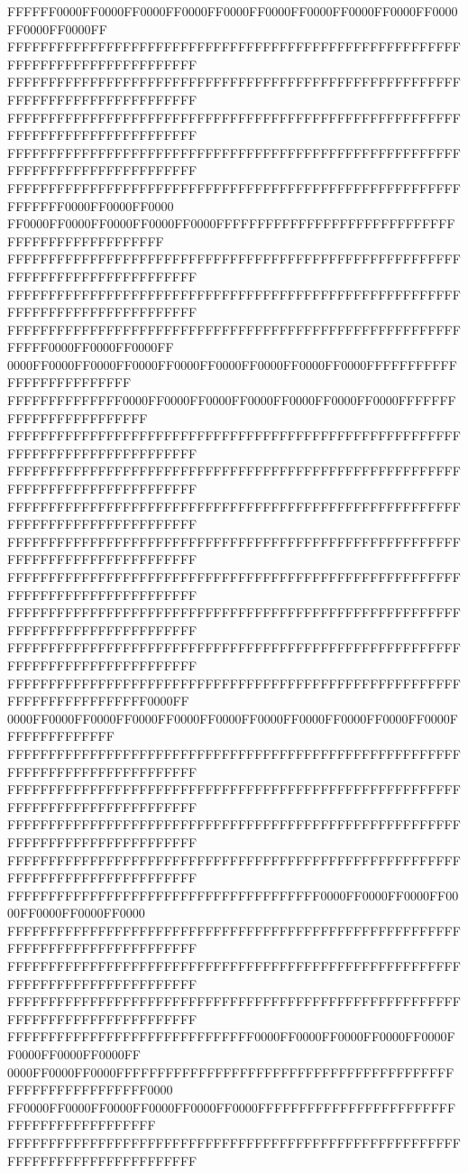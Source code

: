 FFFFFF0000FF0000FF0000FF0000FF0000FF0000FF0000FF0000FF0000FF0000FF0000FF0000FF
FFFFFFFFFFFFFFFFFFFFFFFFFFFFFFFFFFFFFFFFFFFFFFFFFFFFFFFFFFFFFFFFFFFFFFFFFFFFFF
FFFFFFFFFFFFFFFFFFFFFFFFFFFFFFFFFFFFFFFFFFFFFFFFFFFFFFFFFFFFFFFFFFFFFFFFFFFFFF
FFFFFFFFFFFFFFFFFFFFFFFFFFFFFFFFFFFFFFFFFFFFFFFFFFFFFFFFFFFFFFFFFFFFFFFFFFFFFF
FFFFFFFFFFFFFFFFFFFFFFFFFFFFFFFFFFFFFFFFFFFFFFFFFFFFFFFFFFFFFFFFFFFFFFFFFFFFFF
FFFFFFFFFFFFFFFFFFFFFFFFFFFFFFFFFFFFFFFFFFFFFFFFFFFFFFFFFFFFFF0000FF0000FF0000
FF0000FF0000FF0000FF0000FF0000FFFFFFFFFFFFFFFFFFFFFFFFFFFFFFFFFFFFFFFFFFFFFFFF
FFFFFFFFFFFFFFFFFFFFFFFFFFFFFFFFFFFFFFFFFFFFFFFFFFFFFFFFFFFFFFFFFFFFFFFFFFFFFF
FFFFFFFFFFFFFFFFFFFFFFFFFFFFFFFFFFFFFFFFFFFFFFFFFFFFFFFFFFFFFFFFFFFFFFFFFFFFFF
FFFFFFFFFFFFFFFFFFFFFFFFFFFFFFFFFFFFFFFFFFFFFFFFFFFFFFFFFFFF0000FF0000FF0000FF
0000FF0000FF0000FF0000FF0000FF0000FF0000FF0000FF0000FFFFFFFFFFFFFFFFFFFFFFFFFF
FFFFFFFFFFFFFF0000FF0000FF0000FF0000FF0000FF0000FF0000FFFFFFFFFFFFFFFFFFFFFFFF
FFFFFFFFFFFFFFFFFFFFFFFFFFFFFFFFFFFFFFFFFFFFFFFFFFFFFFFFFFFFFFFFFFFFFFFFFFFFFF
FFFFFFFFFFFFFFFFFFFFFFFFFFFFFFFFFFFFFFFFFFFFFFFFFFFFFFFFFFFFFFFFFFFFFFFFFFFFFF
FFFFFFFFFFFFFFFFFFFFFFFFFFFFFFFFFFFFFFFFFFFFFFFFFFFFFFFFFFFFFFFFFFFFFFFFFFFFFF
FFFFFFFFFFFFFFFFFFFFFFFFFFFFFFFFFFFFFFFFFFFFFFFFFFFFFFFFFFFFFFFFFFFFFFFFFFFFFF
FFFFFFFFFFFFFFFFFFFFFFFFFFFFFFFFFFFFFFFFFFFFFFFFFFFFFFFFFFFFFFFFFFFFFFFFFFFFFF
FFFFFFFFFFFFFFFFFFFFFFFFFFFFFFFFFFFFFFFFFFFFFFFFFFFFFFFFFFFFFFFFFFFFFFFFFFFFFF
FFFFFFFFFFFFFFFFFFFFFFFFFFFFFFFFFFFFFFFFFFFFFFFFFFFFFFFFFFFFFFFFFFFFFFFFFFFFFF
FFFFFFFFFFFFFFFFFFFFFFFFFFFFFFFFFFFFFFFFFFFFFFFFFFFFFFFFFFFFFFFFFFFFFFFF0000FF
0000FF0000FF0000FF0000FF0000FF0000FF0000FF0000FF0000FF0000FF0000FFFFFFFFFFFFFF
FFFFFFFFFFFFFFFFFFFFFFFFFFFFFFFFFFFFFFFFFFFFFFFFFFFFFFFFFFFFFFFFFFFFFFFFFFFFFF
FFFFFFFFFFFFFFFFFFFFFFFFFFFFFFFFFFFFFFFFFFFFFFFFFFFFFFFFFFFFFFFFFFFFFFFFFFFFFF
FFFFFFFFFFFFFFFFFFFFFFFFFFFFFFFFFFFFFFFFFFFFFFFFFFFFFFFFFFFFFFFFFFFFFFFFFFFFFF
FFFFFFFFFFFFFFFFFFFFFFFFFFFFFFFFFFFFFFFFFFFFFFFFFFFFFFFFFFFFFFFFFFFFFFFFFFFFFF
FFFFFFFFFFFFFFFFFFFFFFFFFFFFFFFFFFFFFF0000FF0000FF0000FF0000FF0000FF0000FF0000
FFFFFFFFFFFFFFFFFFFFFFFFFFFFFFFFFFFFFFFFFFFFFFFFFFFFFFFFFFFFFFFFFFFFFFFFFFFFFF
FFFFFFFFFFFFFFFFFFFFFFFFFFFFFFFFFFFFFFFFFFFFFFFFFFFFFFFFFFFFFFFFFFFFFFFFFFFFFF
FFFFFFFFFFFFFFFFFFFFFFFFFFFFFFFFFFFFFFFFFFFFFFFFFFFFFFFFFFFFFFFFFFFFFFFFFFFFFF
FFFFFFFFFFFFFFFFFFFFFFFFFFFFFF0000FF0000FF0000FF0000FF0000FF0000FF0000FF0000FF
0000FF0000FF0000FFFFFFFFFFFFFFFFFFFFFFFFFFFFFFFFFFFFFFFFFFFFFFFFFFFFFFFFFF0000
FF0000FF0000FF0000FF0000FF0000FF0000FFFFFFFFFFFFFFFFFFFFFFFFFFFFFFFFFFFFFFFFFF
FFFFFFFFFFFFFFFFFFFFFFFFFFFFFFFFFFFFFFFFFFFFFFFFFFFFFFFFFFFFFFFFFFFFFFFFFFFFFF
